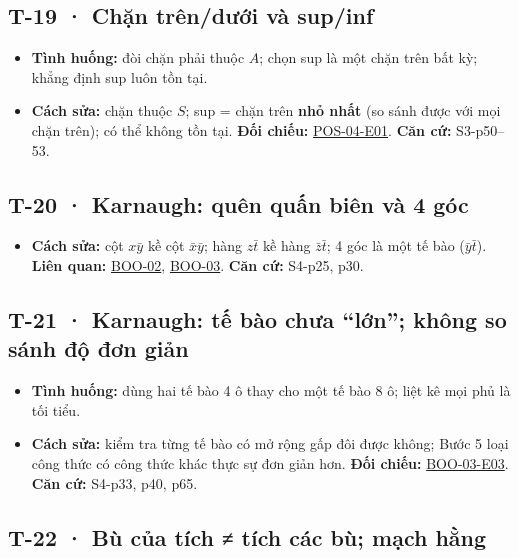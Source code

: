 \documentclass[
  10pt,
  twoside,openany]{book}
\providecommand{\tightlist}{%
  \setlength{\itemsep}{0pt}\setlength{\parskip}{0pt}}
\begin{document}
\hypertarget{T-19}{%
\subsection{T-19 · Chặn trên/dưới và sup/inf}\label{T-19}}

\begin{itemize}
\tightlist
\item
  \textbf{Tình huống:} đòi chặn phải thuộc \(A\); chọn sup là một chặn
  trên bất kỳ; khẳng định sup luôn tồn tại.
\item
  \textbf{Cách sửa:} chặn thuộc \(S\); sup = chặn trên \textbf{nhỏ nhất}
  (so sánh được với mọi chặn trên); có thể không tồn tại. \textbf{Đối
  chiếu:} \protect\hyperlink{POS-04-E01}{POS-04-E01}. \textbf{Căn cứ:}
  S3-p50--53.
\end{itemize}

\hypertarget{T-20}{%
\subsection{T-20 · Karnaugh: quên quấn biên và 4 góc}\label{T-20}}

\begin{itemize}
\tightlist
\item
  \textbf{Cách sửa:} cột \(x\bar y\) kề cột \(\bar x\bar y\); hàng
  \(z\bar t\) kề hàng \(\bar z\bar t\); 4 góc là một tế bào
  (\(\bar y\bar t\)). \textbf{Liên quan:}
  \protect\hyperlink{BOO-02}{BOO-02},
  \protect\hyperlink{BOO-03}{BOO-03}. \textbf{Căn cứ:} S4-p25, p30.
\end{itemize}

\hypertarget{T-21}{%
\subsection{T-21 · Karnaugh: tế bào chưa ``lớn''; không so sánh độ đơn
giản}\label{T-21}}

\begin{itemize}
\tightlist
\item
  \textbf{Tình huống:} dùng hai tế bào 4 ô thay cho một tế bào 8 ô; liệt
  kê mọi phủ là tối tiểu.
\item
  \textbf{Cách sửa:} kiểm tra từng tế bào có mở rộng gấp đôi được không;
  Bước 5 loại công thức có công thức khác thực sự đơn giản hơn.
  \textbf{Đối chiếu:} \protect\hyperlink{BOO-03-E03}{BOO-03-E03}.
  \textbf{Căn cứ:} S4-p33, p40, p65.
\end{itemize}

\hypertarget{T-22}{%
\subsection{T-22 · Bù của tích ≠ tích các bù; mạch hằng}\label{T-22}}
\end{document}
